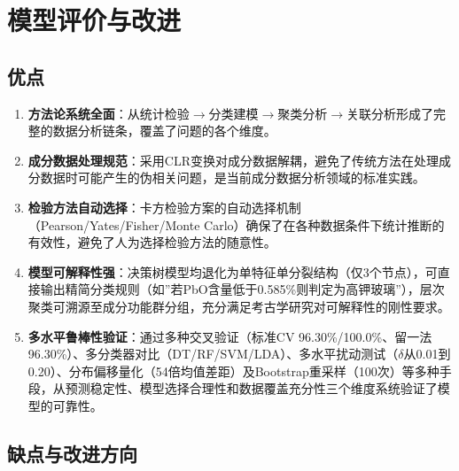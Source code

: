 \documentclass[12pt,a4paper]{ctexart}
\begin{document}
\newpage

\section{模型评价与改进}

\subsection{优点}

\begin{enumerate}[label=(\arabic*), leftmargin=*]
    \item \textbf{方法论系统全面}：从统计检验$\rightarrow$分类建模$\rightarrow$聚类分析$\rightarrow$关联分析形成了完整的数据分析链条，覆盖了问题的各个维度。
    \item \textbf{成分数据处理规范}：采用CLR变换对成分数据解耦，避免了传统方法在处理成分数据时可能产生的伪相关问题，是当前成分数据分析领域的标准实践。
    \item \textbf{检验方法自动选择}：卡方检验方案的自动选择机制（Pearson/Yates/Fisher/Monte Carlo）确保了在各种数据条件下统计推断的有效性，避免了人为选择检验方法的随意性。
    \item \textbf{模型可解释性强}：决策树模型均退化为单特征单分裂结构（仅3个节点），可直接输出精简分类规则（如”若PbO含量低于0.585\%则判定为高钾玻璃”），层次聚类可溯源至成分功能群分组，充分满足考古学研究对可解释性的刚性要求。
    \item \textbf{多水平鲁棒性验证}：通过多种交叉验证（标准CV 96.30\%/100.0\%、留一法96.30\%）、多分类器对比（DT/RF/SVM/LDA）、多水平扰动测试（$\delta$从0.01到0.20）、分布偏移量化（54倍均值差距）及Bootstrap重采样（100次）等多种手段，从预测稳定性、模型选择合理性和数据覆盖充分性三个维度系统验证了模型的可靠性。
\end{enumerate}

\subsection{缺点与改进方向}
\end{document}
